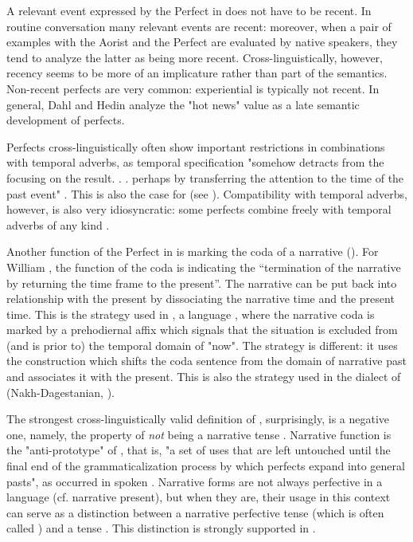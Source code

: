 \documentclass[output=paper]{LSP/langsci}
\begin{document}
A relevant event expressed by the Perfect in  does not have to be recent. In routine conversation many relevant events are recent: moreover, when a pair of examples with the Aorist and the Perfect are evaluated by native speakers, they tend to analyze the latter as being more recent. Cross-linguistically, however, recency seems to be more of an implicature rather than part of the semantics. Non-recent perfects are very common: experiential  is typically not recent. In general, Dahl and Hedin \citep{khachdahlhedin2000} analyze the "hot news" value as a late semantic development of perfects.

Perfects cross-linguistically often show important restrictions in combinations with temporal adverbs, as temporal specification "somehow detracts from the focusing on the  result. . . perhaps by transferring the attention to the time of the past event" \citep[395]{khachdahlhedin2000}. This is also the case for  (see ). Compatibility with temporal adverbs, however, is also very idiosyncratic: some perfects combine freely with temporal adverbs of any kind \citep{khachmaisak2016}. 

Another function of the Perfect in  is marking the coda of a narrative (). For William \citet[65]{khachlabov2001}, the function of the coda is indicating the “termination of the narrative by returning the time frame to the present”. The narrative can be put back into relationship with the present by dissociating the narrative time and the present time. This is the strategy used in , a  language \citep{khachcrane2015}, where the narrative coda is marked by a prehodiernal affix which signals that the situation is excluded from (and is prior to) the temporal domain of "now". The  strategy is different: it uses the  construction which shifts the coda sentence from the domain of narrative past and associates it with the present. This is also the strategy used in the  dialect of  (Nakh-Dagestanian, \citealt{khachmaisak2016}).%


The strongest cross-linguistically valid definition of , surprisingly, is a negative one, namely, the property of \textit{not} being a narrative tense \citep{khachlind2000}. Narrative function is the "anti-prototype" of , that is, "a set of uses that are left untouched until the final end of the grammaticalization process by which perfects expand into general pasts", as occurred in spoken  \citep[280]{khachdahl2014}. Narrative forms are not always perfective in a language (cf. narrative present), but when they are, their usage in this context can serve as a distinction between a narrative perfective tense (which is often called ) and a  tense \citep[cf.][]{khachmaisak2016}. This distinction is strongly supported in .
\end{document}
